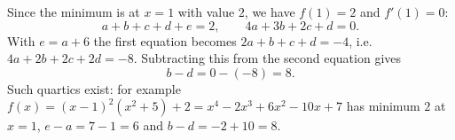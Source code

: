 Since the minimum is at $x=1$ with value $2$, we have $f(1)=2$ and $f'(1)=0$:
\[
a+b+c+d+e=2,\qquad 4a+3b+2c+d=0 .
\]
With $e=a+6$ the first equation becomes $2a+b+c+d=-4$, i.e.\ $4a+2b+2c+2d=-8$. Subtracting this from the second equation gives
\[
b-d=0-(-8)=\boxed{8}.
\]
Such quartics exist: for example $f(x)=(x-1)^2\left(x^2+5\right)+2=x^4-2x^3+6x^2-10x+7$ has minimum $2$ at $x=1$, $e-a=7-1=6$ and $b-d=-2+10=8$.
